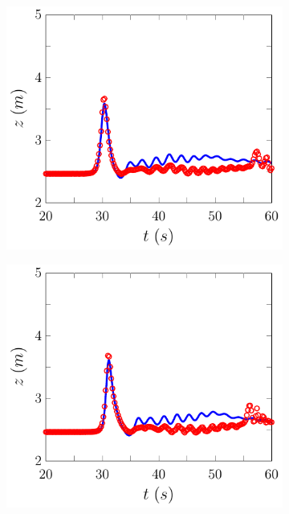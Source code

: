 \begin{figure}
\begin{subfigure}{0.5\textwidth}
		\vspace{0.5cm}
	\end{subfigure}
	\begin{subfigure}{0.5\textwidth}
		\includegraphics[width=\textwidth]{./chp6/figures/Experiment/Roeber/Trial8/FEVM/WG3-figure0.pdf}
		\vspace{0.5cm}
	\end{subfigure}%
	\begin{subfigure}{0.5\textwidth}
		\includegraphics[width=\textwidth]{./chp6/figures/Experiment/Roeber/Trial8/FEVM/WG4-figure0.pdf}

\end{subfigure}
\end{figure}
